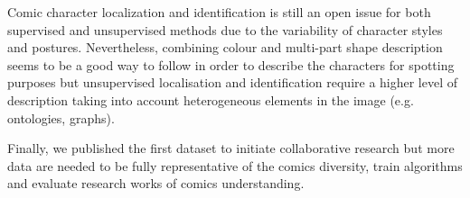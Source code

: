 Comic character localization and identification is still an open issue for both supervised and unsupervised methods due to the variability of character styles and postures.
Nevertheless, combining colour and multi-part shape description seems to be a good way to follow in order to describe the characters for spotting purposes but unsupervised localisation and identification require a higher level of description taking into account heterogeneous elements in the image (e.g. ontologies, graphs).

Finally, we published the first dataset to initiate collaborative research but more data are needed to be fully representative of the comics diversity, train algorithms and evaluate research works of comics understanding.

